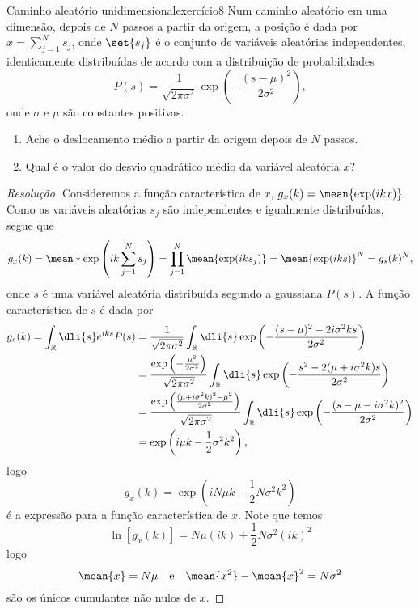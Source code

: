 \begin{exercício}{Caminho aleatório unidimensional}{exercício8}
    Num caminho aleatório em uma dimensão, depois de \(N\) passos a partir da origem, a posição é dada por \(x = \sum_{j=1}^N s_j\), onde \(\set{s_j}\) é o conjunto de variáveis aleatórias independentes, identicamente distribuídas de acordo com a distribuição de probabilidades
    \begin{equation*}
        P(s) = \frac{1}{\sqrt{2\pi \sigma^2}} \exp{\left(-\frac{(s - \mu)^2}{2 \sigma^2}\right)},
    \end{equation*}
    onde \(\sigma\) e \(\mu\) são constantes positivas.
    \begin{enumerate}[label=(\alph*)]
        \item Ache o deslocamento médio a partir da origem depois de \(N\) passos.
        \item Qual é o valor do desvio quadrático médio da variável aleatória \(x\)?
    \end{enumerate}
\end{exercício}
\begin{proof}[Resolução]
    Consideremos a função característica de \(x\), \(g_x(k) = \mean{\exp(ikx)}.\) Como as variáveis aleatórias \(s_j\) são independentes e igualmente distribuídas, segue que
    \begin{equation*}
        g_x(k) = \mean*{\exp\left(ik \sum_{j=1}^N s_j\right)} = \prod_{j=1}^N \mean{\exp(ik s_j)}= \mean{\exp(iks)}^N = g_s(k)^N,
    \end{equation*}
    onde \(s\) é uma variável aleatória distribuída segundo a gaussiana \(P(s)\). A função característica de \(s\) é dada por
    \begin{align*}
        g_s(k) = \int_{\mathbb{R}}\dli{s} e^{iks} P(s)
        &= \frac{1}{\sqrt{2\pi \sigma^2}} \int_{\mathbb{R}}\dli{s} \exp\left(-\frac{(s - \mu)^2 - 2 i\sigma^2 ks}{2 \sigma^2} \right)\\
        &= \frac{\exp\left(-\frac{\mu^2}{2\sigma^2}\right)}{\sqrt{2\pi\sigma^2}}\int_{\mathbb{R}}\dli{s} \exp\left(-\frac{s^2 - 2 (\mu + i\sigma^2 k)s}{2 \sigma^2} \right)\\
        &= \frac{\exp\left(\frac{(\mu + i \sigma^2 k)^2-\mu^2}{2\sigma^2}\right)}{\sqrt{2\pi\sigma^2}}\int_{\mathbb{R}}\dli{s} \exp\left(-\frac{(s - \mu - i \sigma^2 k)^2}{2 \sigma^2}\right)\\
        &= \exp\left(i \mu k - \frac12 \sigma^2 k^2\right),
    \end{align*}
    logo
    \begin{equation*}
        g_x(k) = \exp\left(i N\mu k - \frac12 N\sigma^2 k^2\right)
    \end{equation*}
    é a expressão para a função característica de \(x\). Note que temos
    \begin{equation*}
        \ln\left[g_x(k)\right] = N \mu (ik) + \frac12 N \sigma^2 (ik)^2
    \end{equation*}
    logo
    \begin{equation*}
        \mean{x} = N \mu
        \quad\text{e}\quad
        \mean{x^2} - \mean{x}^2 = N \sigma^2
    \end{equation*}
    são os únicos cumulantes não nulos de \(x\).
\end{proof}
